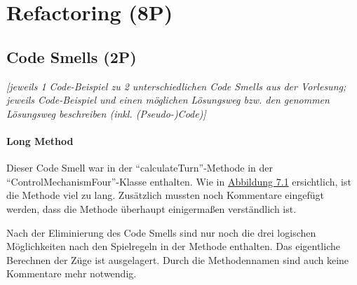 

\newpage
\titlespacing*{\chapter}{0pt}{-30mm}{10pt}
  
\chapter{Refactoring (8P)}
\pagestyle{scrheadings}
\clearscrheadfoot
{}
\setcounter{page}{32}
\ofoot[\pagemark]{\pagemark}
\onehalfspacing

\section{Code Smells (2P)}
\emph{[jeweils 1 Code-Beispiel zu 2 unterschiedlichen Code Smells aus der Vorlesung; jeweils Code-Beispiel
und einen möglichen Lösungsweg bzw. den genommen Lösungsweg beschreiben (inkl. (Pseudo-)Code)]}

\subsubsection{Long Method}
\noindent Dieser Code Smell war in der \enquote{calculateTurn}-Methode in der \enquote{ControlMechanismFour}-Klasse enthalten. Wie in \hyperref[fig:longmethod]{Abbildung 7.1} ersichtlich, ist die Methode viel zu lang. Zusätzlich mussten noch Kommentare eingefügt werden, dass die Methode überhaupt einigermaßen verständlich ist. 

Nach der Eliminierung des Code Smells sind nur noch die drei logischen Möglichkeiten nach den Spielregeln in der Methode enthalten. Das eigentliche Berechnen der Züge ist ausgelagert. Durch die Methodennamen sind auch keine Kommentare mehr notwendig.

